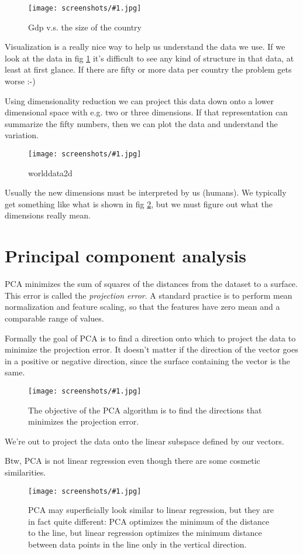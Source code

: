 \documentclass[a4, 12pt, english, USenglish]{scrreprt}
\newcommand{\screenshot}[2]{
\begin{figure}[htb]
\texttt{[image: screenshots/\#1.jpg]}
\label{#1}
\caption{#2}
\end{figure}}
\newcommand{\idx}[1]{{\em #1}\index{#1}}
\begin{document}
\screenshot{worldddata}{Gdp v.s. the size of the country}

Visualization is a really nice way to help us understand the data we
use.  If we look at the data in fig \ref{worldddata} it's difficult to
see any kind of structure in that data, at least at first glance.  If
there are fifty or more data per country the problem gets worse :-)

Using dimensionality reduction we can project this data down onto a
lower dimensional space with e.g. two or three dimensions.  If that
representation can summarize the fifty numbers, then we can plot the
data and understand the variation.

\screenshot{worlddata2d}{worlddata2d}

Usually the new dimensions must be interpreted by us (humans). We
typically get something like what is shown in fig \ref{worlddata2d},
but we must figure out what the dimensions really mean.

\section{Principal component analysis}

PCA  minimizes the sum of squares of the distances from  the dataset
to a surface.  This error is called the \idx{projection error}.   A
standard practice is to perform mean normalization and feature
scaling, so that the features have zero mean and a comparable range of
values.

Formally the goal of PCA is to find a direction onto which to project
the data to minimize the projection error.  It doesn't matter if the
direction of the vector goes in a positive or negative direction,
since the surface containing the vector is the same.

\screenshot{pcaobjective}{The objective of the PCA algorithm is to
  find the directions that minimizes the projection error.}

We're out to project the data onto the linear subspace defined by our
vectors.

Btw, PCA is not linear regression even though there are some cosmetic
similarities.

\screenshot{pcavslinreg}{PCA may superficially look similar to linear
  regression, but they are in fact quite different:   PCA optimizes
  the minimum of the distance to the line, but linear regression
  optimizes the minimum distance between data points in the line only
  in the vertical direction.}
\end{document}
